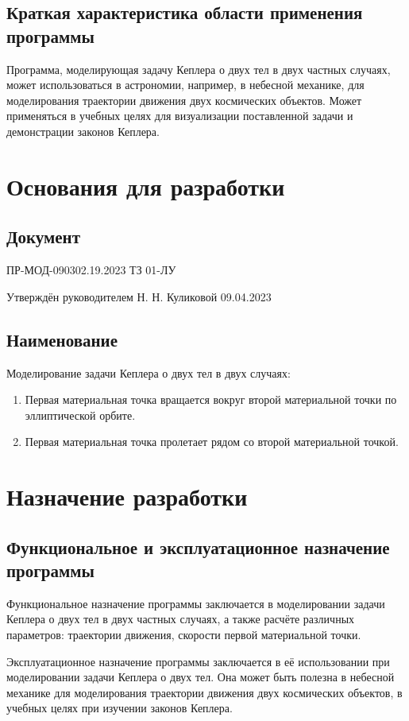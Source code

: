  \subsection{Краткая характеристика области применения программы}
 Программа, моделирующая задачу Кеплера о двух тел в двух частных случаях, может использоваться в астрономии, например, в небесной механике, для моделирования траектории движения двух космических объектов. Может применяться в учебных целях для визуализации поставленной задачи и демонстрации законов Кеплера.
 \section{Основания для разработки}
 \subsection{Документ}
 ПР-МОД-090302.19.2023 ТЗ 01-ЛУ

 Утверждён руководителем Н. Н. Куликовой 09.04.2023
 \subsection{Наименование}
 Моделирование задачи Кеплера о двух тел в двух случаях:
 \begin{enumerate}
  \item Первая материальная точка вращается вокруг второй материальной точки по эллиптической орбите.
  \item Первая материальная точка пролетает рядом со второй материальной точкой.
 \end{enumerate}
 \section{Назначение разработки}
 \subsection{Функциональное и эксплуатационное назначение программы}
 Функциональное назначение программы заключается в моделировании задачи Кеплера о двух тел в двух частных случаях, а также расчёте различных параметров: траектории движения, скорости первой материальной точки.

 Эксплуатационное назначение программы заключается в её использовании при моделировании задачи Кеплера о двух тел. Она может быть полезна в небесной механике для моделирования траектории движения двух космических объектов, в учебных целях при изучении законов Кеплера.

